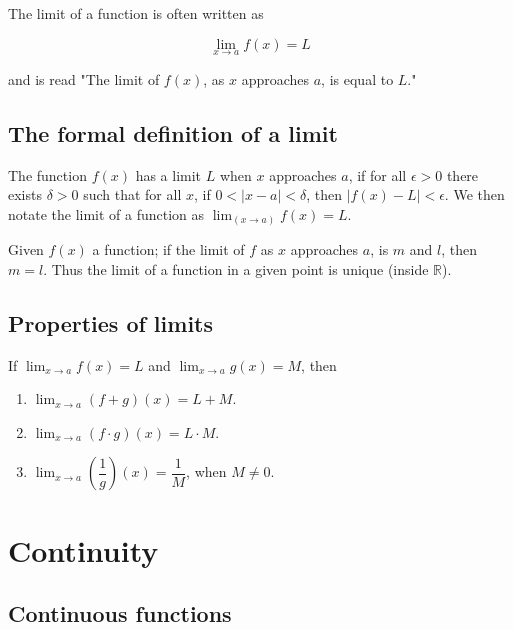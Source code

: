 \documentclass{report}
\begin{document}
The limit of a function is often written as

$$\lim_{x \to a} f(x) = L$$

and is read "The limit of $f(x)$, as $x$ approaches $a$, is equal to $L$."


\section{The formal definition of a limit}

\begin{defBox}
    The function $f(x)$ has a limit $L$ when $x$ approaches $a$, if for all $\epsilon > 0$ there exists $\delta > 0$ such that for all $x$, if $0 < |x-a| <\delta$, then $|f(x)-L| < \epsilon$. We then notate the limit of a function as $\lim_(x \to a) f(x) = L$.
\end{defBox}

\begin{thBox}
    Given $f(x)$ a function; if the limit of $f$ as $x$ approaches $a$, is $m$ and $l$, then $m=l$. Thus the limit of a function in a given point is unique (inside $\mathbb{R}$).
\end{thBox}

\section{Properties of limits}

\begin{thBox}
    If $\lim_{x \to a} f(x) = L$ and $\lim_{x \to a} g(x) = M$, then

    \begin{enumerate}
        \item $\lim_{x \to a} (f + g)(x) = L + M$.
        \item $\lim_{x \to a} (f \cdot g)(x) = L \cdot M$.
        \item $\lim_{x \to a} (\dfrac{1}{g})(x) = \dfrac{1}{M}$, when $M \not = 0$.
    \end{enumerate}
\end{thBox}

\chapter{Continuity}

\section{Continuous functions}
\end{document}
